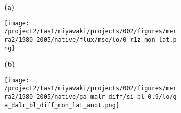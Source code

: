 \documentclass[preview]{standalone}
\begin{document}
\begin{figure}

  \begin{subfigure}[t]{0.05\textwidth}
    \textbf{\large{(a)}}
  \end{subfigure}
  \begin{subfigure}[t]{0.95\textwidth}
    \texttt{[image: /project2/tas1/miyawaki/projects/002/figures/merra2/1980\_2005/native/flux/mse/lo/0\_r1z\_mon\_lat.png]}
  \end{subfigure}
  
  \begin{subfigure}[t]{0.05\textwidth}
    \textbf{\large{(b)}}
  \end{subfigure}
  \begin{subfigure}[t]{0.95\textwidth}
    \texttt{[image: /project2/tas1/miyawaki/projects/002/figures/merra2/1980\_2005/native/ga\_malr\_diff/si\_bl\_0.9/lo/ga\_dalr\_bl\_diff\_mon\_lat\_anot.png]}
  \end{subfigure}
  
\end{figure}
  
\end{document}
